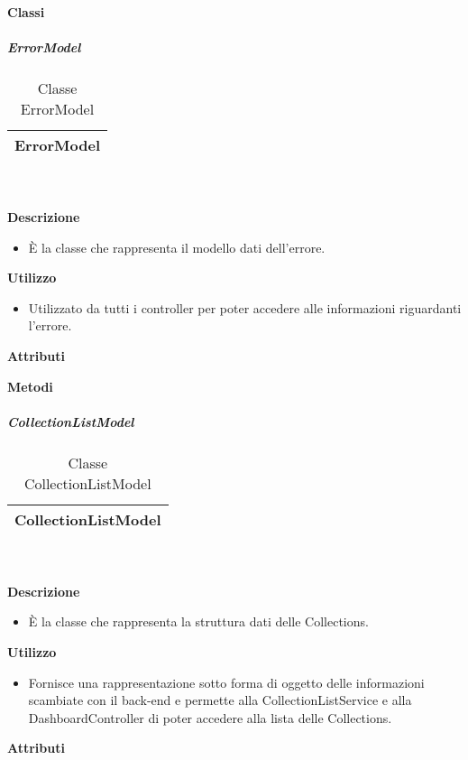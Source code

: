 		\paragraph{Classi}
			\subparagraph{ErrorModel} 
\begin{table}[ht]
\begin{center}
\bgroup
	\setlength{\arrayrulewidth}{0.6mm}
	\def\arraystretch{1}
		\begin{tabular}{ | p{12cm} | }
				\hline  
					\centerline{\textbf{ErrorModel}}
		\\ \hline 
				\hline
				\hline
		
		\end{tabular}
\egroup
\caption{Classe ErrorModel}
\end{center}
\end{table}  \textbf{\\ \\ Descrizione} 
					\begin{itemize}
						\item[] È la classe che rappresenta il modello dati dell'errore.
					\end{itemize}      
				\textbf{Utilizzo}  
					\begin{itemize}
						\item[] Utilizzato da tutti i controller per poter accedere alle informazioni riguardanti l'errore.
					\end{itemize}
			 \textbf{Attributi} 
	\begin{itemize}
		\end{itemize}
		
		\textbf{Metodi} 
	\begin{itemize}
		\end{itemize}
			\subparagraph{CollectionListModel} 
\begin{table}[ht]
\begin{center}
\bgroup
	\setlength{\arrayrulewidth}{0.6mm}
	\def\arraystretch{1}
		\begin{tabular}{ | p{12cm} | }
				\hline  
					\centerline{\textbf{CollectionListModel}}
		\\ \hline 
				\hline
				\hline
		
		\end{tabular}
\egroup
\caption{Classe CollectionListModel}
\end{center}
\end{table}  \textbf{\\ \\ Descrizione} 
					\begin{itemize}
						\item[] È la classe che rappresenta la struttura dati delle Collections.
					\end{itemize}      
				\textbf{Utilizzo}  
					\begin{itemize}
						\item[] Fornisce una rappresentazione sotto forma di oggetto delle informazioni scambiate con il back-end e permette alla CollectionListService e alla DashboardController di poter accedere alla lista delle Collections.
					\end{itemize}
			 \textbf{Attributi} 
	\begin{itemize}
		\end{itemize}
		
